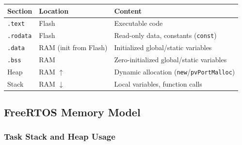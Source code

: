   \begin{center}
    \begin{tabular}{lll}
      \toprule
      \textbf{Section} & \textbf{Location} & \textbf{Content} \\ \midrule
      \texttt{.text}   & Flash & Executable code \\
      \texttt{.rodata} & Flash & Read-only data, constants (\texttt{const}) \\
      \texttt{.data}   & RAM (init from Flash) & Initialized global/static variables \\
      \texttt{.bss}    & RAM & Zero-initialized global/static variables \\
      Heap             & RAM $\uparrow$ & Dynamic allocation (\texttt{new}/\texttt{pvPortMalloc}) \\
      Stack            & RAM $\downarrow$ & Local variables, function calls \\ \bottomrule
    \end{tabular}
  \end{center}

\subsection{FreeRTOS Memory Model}

  \subsubsection{Task Stack and Heap Usage}
  

